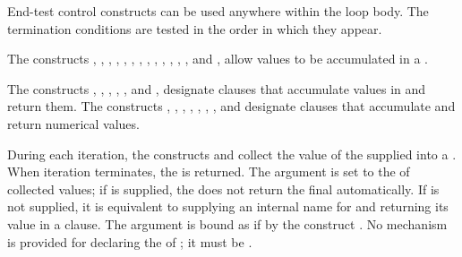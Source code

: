 End-test control constructs can be used anywhere within the loop
body.  The termination conditions are tested in the order in which
they appear.

 
The constructs , ,
, ,
, ,
, ,
, ,
, ,
, and ,
allow values to be accumulated in a .
 
 
 
The constructs , 
, , , 
, and , 
designate clauses that
accumulate values in  and return them.
The constructs , , 
, , , ,
, and  designate clauses that accumulate and
return numerical values.

During each iteration,  the constructs
 and 
collect the value of the supplied
 into a . 
When iteration terminates, the  is returned.
The argument  is 
set to the  
of collected values; if  is supplied, the 
does not return the final  automatically.  If 
 is not
supplied, it is equivalent to supplying an internal name for
 and returning its value in a  clause.
The  argument
is bound as if by the construct .
No mechanism is provided for declaring the  of ;
it must be .
 


